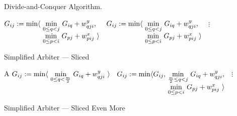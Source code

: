 \begin{paragraph}{Divide-and-Conquer Algorithm.}

\begin{algorithm}
\renewcommand\arraystretch{1.3}
\begin{algorithmic}
      
      \State $G_{ij} :=
        \begin{array}[t]{@{}l@{~}l} 
          \min\langle & \underset{0\leq q<j}\min ~ G_{iq} + \yw{qji}, \\
                      & \underset{0\leq p<i}\min ~ G_{pj} + \xw{pij}~\rangle \\         
        \end{array}$
    \EndFor
  \EndFor
      
      \State $G_{ij} :=
        \begin{array}[t]{@{}l@{~}l} 
          \min\langle & \underset{0\leq q<j}\min ~ G_{iq} + \yw{qji}, \\
                      & \underset{0\leq p<i}\min ~ G_{pj} + \xw{pij}~\rangle \\         
        \end{array}$
    \EndFor
  \EndFor
  \State $\vdots$ 
\end{algorithmic}
\caption{\label{intro:breakdown}
   Simplified Arbiter --- Sliced}
\end{algorithm}


\begin{algorithm}
\renewcommand\arraystretch{1.3}
\begin{algorithmic}
\EndProcedure
  \State A 
      
      \State $G_{ij} :=
        \begin{array}[t]{@{}l@{~}l} 
          \min\langle & \underset{0\leq q<\frac{m}{2}}\min ~ G_{iq} + \yw{qji}~\rangle \\         
        \end{array}$
    \EndFor
  \EndFor
      \State $G_{ij} :=
        \begin{array}[t]{@{}l@{~}l} 
          \min\langle G_{ij}, & \underset{\frac{m}{2}\leq q<j}\min ~ G_{iq} + \yw{qji}, \\
                      & \underset{0\leq p<i}\min ~ G_{pj} + \xw{pij}~\rangle \\         
        \end{array}$
    \EndFor
  \EndFor
  \State $\vdots$
\end{algorithmic}
\caption{\label{intro:further-breakdown}
   Simplified Arbiter --- Sliced Even More}
\end{algorithm}



\end{paragraph}
